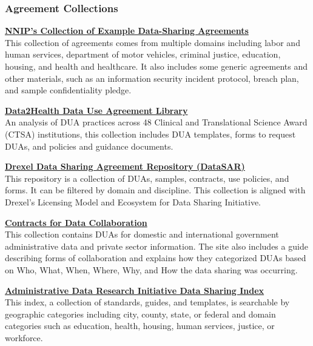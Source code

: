 \hypertarget{agreement-collections}{%
\subsubsection*{Agreement Collections}\label{agreement-collections}}

\textbf{\href{https://www.neighborhoodindicators.org/library/guides/nnip\%E2\%80\%99s-collection-example-data-sharing-agreements}{NNIP's Collection of Example Data-Sharing Agreements}}\\
This collection of agreements comes from multiple domains including labor and human services, department of motor vehicles, criminal justice, education, housing, and health and healthcare. It also includes some generic agreements and other materials, such as an information security incident protocol, breach plan, and sample confidentiality pledge.

\textbf{\href{https://github.com/data2health/governance-pathways/blob/master/library.md}{Data2Health Data Use Agreement Library}}\\
An analysis of DUA practices across 48 Clinical and Translational Science Award (CTSA) institutions, this collection includes DUA templates, forms to request DUAs, and policies and guidance documents.

\textbf{\href{http://datasar.cci.drexel.edu/index.html}{Drexel Data Sharing Agreement Repository (DataSAR)}}\\
This repository is a collection of DUAs, samples, contracts, use policies, and forms. It can be filtered by domain and discipline. This collection is aligned with Drexel's Licensing Model and Ecosystem for Data Sharing Initiative.

\textbf{\href{https://contractsfordatacollaboration.org/library/}{Contracts for Data Collaboration}}\\
This collection contains DUAs for domestic and international government administrative data and private sector information. The site also includes a guide describing forms of collaboration and explains how they categorized DUAs based on Who, What, When, Where, Why, and How the data sharing was occurring.

\textbf{\href{https://adri.georgetown.edu/}{Administrative Data Research Initiative Data Sharing Index}}\\
This index, a collection of standards, guides, and templates, is searchable by geographic categories including city, county, state, or federal and domain categories such as education, health, housing, human services, justice, or workforce.

